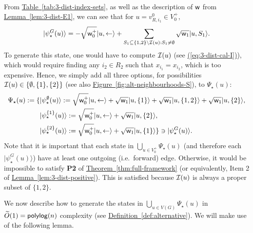 \documentclass{article}
\newcommand{\eq}[1]{\hyperref[eq:#1]{(\ref*{eq:#1})}}
\newcommand{\thm}[1]{\hyperref[thm:#1]{Theorem~\ref*{thm:#1}}}
\newcommand{\lem}[1]{\hyperref[lem:#1]{Lemma~\ref*{lem:#1}}}
\newcommand{\tabl}[1]{\hyperref[tab:#1]{Table~\ref*{tab:#1}}}
\newcommand{\defin}[1]{\hyperref[def:#1]{Definition~\ref*{def:#1}}}
\newcommand{\fig}[1]{\hyperref[fig:#1]{Figure~\ref*{fig:#1}}}
\def\ket#1{{\lvert}#1\rangle}
\renewcommand{\>}{\rangle}
\newcommand{\<}{\langle}
\renewcommand{\(}{\left(}
\renewcommand{\)}{\right)}
\def\w{{\sf w}}
\begin{document}
From \tabl{3-dist-index-sets}, as well as the description of $\w$ from \lem{3-dist-E1}, we can see that for $u=v_{R,i_1}^0\in V_0^+$, 
$$\ket{\psi^G_\star(u)}=-\sqrt{\w_0^+}\ket{u,\leftarrow}+\sum_{S_1\subseteq\{1,2\}\setminus{\cal I}(u):S_1\neq\emptyset}\sqrt{\w_1}\ket{u,S_1}.$$
To generate this state, one would have to compute ${\cal I}(u)$ (see \eq{3-dist-cal-I}), which would require finding any $i_2\in R_2$ such that $x_{i_1}=x_{i_2}$, which is too expensive. Hence, we simply add all three options, for possibilities ${\cal I}(u)\in\{\emptyset,\{1\},\{2\}\}$ (see also \fig{alt-neighbourhoods-S}),
to $\Psi_\star(u)$:
\begin{equation}
\begin{split}
\Psi_\star(u) := \{&\ket{\psi_\star^{\emptyset}(u)}:=\sqrt{\w_0^+}\ket{u,\leftarrow}+\sqrt{\w_1}\ket{u,\{1\}}+\sqrt{\w_1}\ket{u,\{1,2\}}+\sqrt{\w_1}\ket{u,\{2\}},\\
&\ket{\psi_\star^{\{1\}}(u)}:=\sqrt{\w_0^+}\ket{u,\leftarrow}+\sqrt{\w_1}\ket{u,\{2\}},\\
&\ket{\psi_\star^{\{2\}}(u)}:=\sqrt{\w_0^+}\ket{u,\leftarrow}+\sqrt{\w_1}\ket{u,\{1\}}
\} \ni \ket{\psi_\star^G(u)}.
\end{split}\label{eq:3-dist-stars}
\end{equation}
Note that it is important that each state in $\bigcup_{u\in V_0^+}\Psi_\star(u)$ (and therefore each $\ket{\psi_\star^{G}(u)}$) have at least one outgoing (i.e.~forward) edge. Otherwise, it would be impossible to satisfy \textbf{P2} of \thm{full-framework} (or equivalently, Item 2 of \lem{3-dist-positive}). This is satisfied because ${\cal I}(u)$ is always a proper subset of $\{1,2\}$.

We now describe how to generate the states in $\bigcup_{u\in V(G)}\Psi_\star(u)$ in $\widetilde{O}(1)={\sf polylog}(n)$ complexity (see \defin{alternative}). We will make use of the following lemma.
\end{document}
